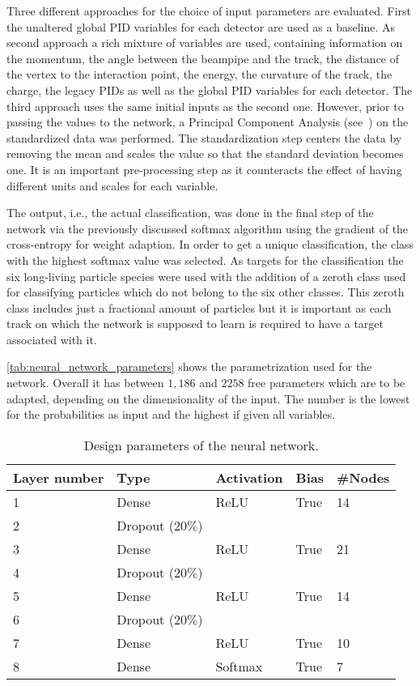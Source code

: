 Three different approaches for the choice of input parameters are evaluated. First the unaltered global PID variables for each detector are used as a baseline. As second approach a rich mixture of variables are used, containing information on the momentum, the angle between the beampipe and the track, the distance of the vertex to the interaction point, the energy, the curvature of the track, the charge, the legacy PIDs as well as the global PID variables for each detector. The third approach uses the same initial inputs as the second one. However, prior to passing the values to the network, a Principal Component Analysis (see~\cite{BigDataManagementAndAnalytics:TextProcessingAndHigh-DimensionalData}) on the standardized data was performed. The standardization step centers the data by removing the mean and scales the value so that the standard deviation becomes one. It is an important pre-processing step as it counteracts the effect of having different units and scales for each variable.

The output, i.e., the actual classification, was done in the final step of the network via the previously discussed softmax algorithm using the gradient of the cross-entropy for weight adaption. In order to get a unique classification, the class with the highest softmax value was selected. As targets for the classification the six long-living particle species were used with the addition of a zeroth class used for classifying particles which do not belong to the six other classes. This zeroth class includes just a fractional amount of particles but it is important as each track on which the network is supposed to learn is required to have a target associated with it.

\autoref{tab:neural_network_parameters} shows the parametrization used for the network. Overall it has between $1,186$ and $2258$ free parameters which are to be adapted, depending on the dimensionality of the input. The number is the lowest for the probabilities as input and the highest if given all variables.

\begin{table}[ht]
	\centering
	\begin{tabular}{l|llll}
		Layer number & Type & Activation & Bias & \#Nodes  \\
		\hline
		1 & Dense & ReLU & True & 14 \\
		2 & Dropout ($20\%$) \\
		3 & Dense & ReLU & True & 21 \\
		4 & Dropout ($20\%$) \\
		5 & Dense & ReLU & True & 14 \\
		6 & Dropout ($20\%$) \\
		7 & Dense & ReLU & True & 10 \\
		8 & Dense & Softmax & True & 7
	\end{tabular}
	\caption{Design parameters of the neural network.}
	\label{tab:neural_network_parameters}
\end{table}

